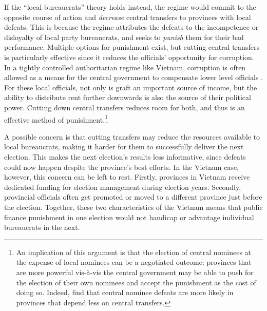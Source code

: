 \documentclass[12pt]{article}\usepackage[]{graphicx}\usepackage[]{color}
\newcommand{\1}{\mathbbm{1}}
\begin{document}
If the ``local bureaucrats'' theory holds instead, the regime would commit to the opposite course of action and \textit{decrease} central transfers to provinces with local defeats. This is because the regime attributes the defeats to the incompetence or disloyalty of local party bureaucrats, and seeks to \textit{punish} them for their bad performance. Multiple options for punishment exist, but cutting central transfers is particularly effective since it reduces the officials' opportunity for corruption. In a tightly controlled authoritarian regime like Vietnam, corruption is often allowed as a means for the central government to compensate lower level officials \citep{Darden2008}. For these local officials, not only is graft an important source of income, but the ability to distribute rent further downwards is also the source of their political power. Cutting down central transfers reduces room for both, and thus is an effective method of punishment.\footnote{An implication of this argument is that the election of central nominees at the expense of local nominees can be a negotiated outcome: provinces that are more powerful vis-\`{a}-vis the central government may be able to push for the election of their own nominees and accept the punishment as the cost of doing so. Indeed, \cite{MaleskySchuler2011} find that central nominee defeats are more likely in provinces that depend less on central transfers.}

A possible concern is that cutting transfers may reduce the resources available to local bureaucrats, making it harder for them to successfully deliver the next election. This makes the next election's results less informative, since defeats could now happen despite the province's best efforts. In the Vietnam case, however, this concern can be left to rest. Firstly, provinces in Vietnam receive dedicated funding for election management during election years. Secondly, provincial officials often get promoted or moved to a different province just before the election. Together, these two characteristics of the Vietnam means that public finance punishment in one election would not handicap or advantage individual bureaucrats in the next.
\end{document}
